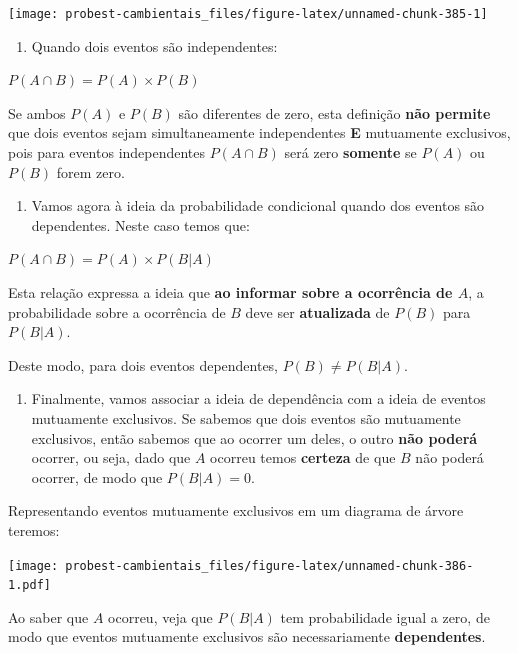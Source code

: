 \documentclass[
]{book}
\providecommand{\tightlist}{%
  \setlength{\itemsep}{0pt}\setlength{\parskip}{0pt}}
\begin{document}
\begin{center}\texttt{[image: probest-cambientais\_files/figure-latex/unnamed-chunk-385-1]} \end{center}

\begin{enumerate}
\def\labelenumi{\arabic{enumi}.}
\setcounter{enumi}{3}
\tightlist
\item
  Quando dois eventos são independentes:
\end{enumerate}

\(P(A \cap B) = P(A) \times P(B)\)

Se ambos \(P(A)\) e \(P(B)\) são diferentes de zero, esta definição \textbf{não permite} que dois eventos sejam simultaneamente independentes \textbf{E} mutuamente exclusivos, pois para eventos independentes \(P(A \cap B)\) será zero \textbf{somente} se \(P(A)\) ou \(P(B)\) forem zero.

\begin{enumerate}
\def\labelenumi{\arabic{enumi}.}
\setcounter{enumi}{4}
\tightlist
\item
  Vamos agora à ideia da probabilidade condicional quando dos eventos são dependentes. Neste caso temos que:
\end{enumerate}

\(P(A \cap B) = P(A) \times P(B|A)\)

Esta relação expressa a ideia que \textbf{ao informar sobre a ocorrência de \(A\)}, a probabilidade sobre a ocorrência de \(B\) deve ser \textbf{atualizada} de \(P(B)\) para \(P(B|A)\).

Deste modo, para dois eventos dependentes, \(P(B) \ne P(B|A)\).

\begin{enumerate}
\def\labelenumi{\arabic{enumi}.}
\setcounter{enumi}{5}
\tightlist
\item
  Finalmente, vamos associar a ideia de dependência com a ideia de eventos mutuamente exclusivos. Se sabemos que dois eventos são mutuamente exclusivos, então sabemos que ao ocorrer um deles, o outro \textbf{não poderá} ocorrer, ou seja, dado que \(A\) ocorreu temos \textbf{certeza} de que \(B\) não poderá ocorrer, de modo que \(P(B|A) = 0\).
\end{enumerate}

Representando eventos mutuamente exclusivos em um diagrama de árvore teremos:

\texttt{[image: probest-cambientais\_files/figure-latex/unnamed-chunk-386-1.pdf]}

Ao saber que \(A\) ocorreu, veja que \(P(B|A)\) tem probabilidade igual a zero, de modo que eventos mutuamente exclusivos são necessariamente \textbf{dependentes}.
\end{document}
